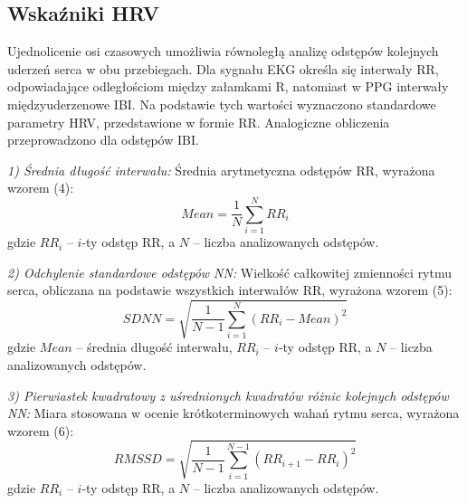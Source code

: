 \documentclass[journal]{IEEEtran}
\begin{document}

\newpage
\subsection{Wskaźniki HRV}
Ujednolicenie osi czasowych umożliwia równoległą analizę odstępów kolejnych uderzeń serca w obu przebiegach. Dla sygnału EKG określa się interwały RR, odpowiadające odległościom między załamkami R, natomiast w PPG interwały międzyuderzenowe IBI. Na podstawie tych wartości wyznaczono standardowe parametry HRV, przedstawione w formie RR. Analogiczne obliczenia przeprowadzono dla odstępów IBI.

\noindent\textit{1) Średnia długość interwału:} 
Średnia arytmetyczna odstępów RR, wyrażona wzorem (4):
\begin{equation}
    Mean = \frac{1}{N} \sum_{i=1}^{N} RR_i
\end{equation}
gdzie $RR_i$ -- $i$-ty odstęp RR, a $N$ – liczba analizowanych odstępów.

\noindent\textit{2) Odchylenie standardowe odstępów NN:} 
Wielkość całkowitej zmienności rytmu serca, obliczana na podstawie wszystkich interwałów RR, wyrażona wzorem (5):
\begin{equation}
    SDNN = \sqrt{\frac{1}{N-1} \sum_{i=1}^{N} (RR_i - Mean)^2}
\end{equation}
gdzie $Mean$ – średnia długość interwału, $RR_i$ – $i$-ty odstęp RR, a $N$ – liczba analizowanych odstępów. \textbf{}

\noindent\textit{3) Pierwiastek kwadratowy z uśrednionych kwadratów różnic kolejnych odstępów NN:} 
Miara stosowana w ocenie krótkoterminowych wahań rytmu serca, wyrażona wzorem (6):
\begin{equation}
    RMSSD = \sqrt{\frac{1}{N-1} \sum_{i=1}^{N-1} (RR_{i+1} - RR_i)^2}
\end{equation}
gdzie $RR_i$ -- $i$-ty odstęp RR, a $N$ – liczba analizowanych odstępów.
\end{document}

